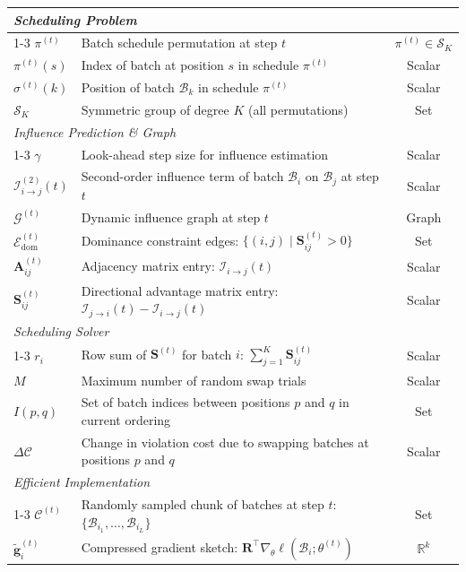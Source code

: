 \begin{table}[H]
\begin{tabularx}{0.85\linewidth}{lXc}
\midrule
\multicolumn{3}{l}{\textit{Scheduling Problem}} \\
\cmidrule{1-3}
$\pi^{(t)}$ & Batch schedule permutation at step $t$ & $\pi^{(t)} \in \mathcal{S}_K$ \\
$\pi^{(t)}(s)$ & Index of batch at position $s$ in schedule $\pi^{(t)}$ & Scalar \\
$\sigma^{(t)}(k)$ & Position of batch $\mathcal{B}_k$ in schedule $\pi^{(t)}$ & Scalar \\
$\mathcal{S}_K$ & Symmetric group of degree $K$ (all permutations) & Set \\
\midrule
\multicolumn{3}{l}{\textit{Influence Prediction \& Graph}} \\
\cmidrule{1-3}
$\gamma$ & Look-ahead step size for influence estimation & Scalar \\
$\mathcal{I}_{i \to j}^{(2)}(t)$ & Second-order influence term of batch $\mathcal{B}_i$ on $\mathcal{B}_j$ at step $t$ & Scalar \\
$\mathcal{G}^{(t)}$ & Dynamic influence graph at step $t$ & Graph \\
$\mathcal{E}^{(t)}_{\mathrm{dom}}$ & Dominance constraint edges: $\{(i,j) \mid \mathbf{S}^{(t)}_{ij} > 0\}$ & Set \\
$\mathbf{A}^{(t)}_{ij}$ & Adjacency matrix entry: $\mathcal{I}_{i \to j}(t)$ & Scalar \\
$\mathbf{S}^{(t)}_{ij}$ & Directional advantage matrix entry: $\mathcal{I}_{j \to i}(t) - \mathcal{I}_{i \to j}(t)$ & Scalar \\
\midrule
\multicolumn{3}{l}{\textit{Scheduling Solver}} \\
\cmidrule{1-3}
$r_i$ & Row sum of $\mathbf{S}^{(t)}$ for batch $i$: $\sum_{j=1}^K \mathbf{S}^{(t)}_{ij}$ & Scalar \\
$M$ & Maximum number of random swap trials & Scalar \\
$I(p,q)$ & Set of batch indices between positions $p$ and $q$ in current ordering & Set \\
$\Delta\mathcal{C}$ & Change in violation cost due to swapping batches at positions $p$ and $q$ & Scalar \\
\midrule
\multicolumn{3}{l}{\textit{Efficient Implementation}} \\
\cmidrule{1-3}
$\mathcal{C}^{(t)}$ & Randomly sampled chunk of batches at step $t$: $\{\mathcal{B}_{i_1}, \dots, \mathcal{B}_{i_L}\}$ & Set \\
$\tilde{\mathbf{g}}^{(t)}_i$ & Compressed gradient sketch: $\mathbf{R}^\top \nabla_\theta \ell(\mathcal{B}_i; \theta^{(t)})$ & $\mathbb{R}^k$ \\

\end{tabularx}
\end{table}
